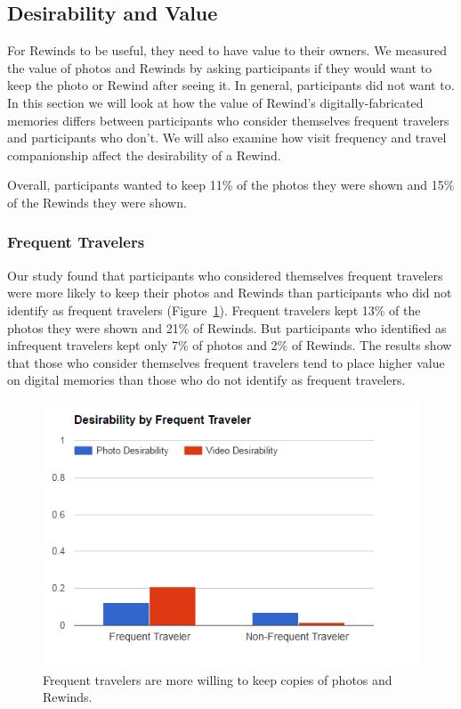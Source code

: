 \documentclass{sigchi}
\begin{document}
\subsection{Desirability and Value}
For Rewinds to be useful, they need to have value to their owners. We measured the value of photos and Rewinds by asking participants if they would want to keep the photo or Rewind after seeing it. In general, participants did not want to. In this section we will look at how the value of Rewind's digitally-fabricated memories differs between participants who consider themselves frequent travelers and participants who don't. We will also examine how visit frequency and travel companionship affect the desirability of a Rewind.

Overall, participants wanted to keep 11\% of the photos they were shown and 15\% of the Rewinds they were shown.

\subsubsection{Frequent Travelers}
Our study found that participants who considered themselves frequent travelers were more likely to keep their photos and Rewinds than participants who did not identify as frequent travelers (Figure~\ref{fig:frequencydesire}). Frequent travelers kept 13\% of the photos they were shown and 21\% of Rewinds. But participants who identified as infrequent travelers kept only 7\% of photos and 2\% of Rewinds. The results show that those who consider themselves frequent travelers tend to place higher value on digital memories than those who do not identify as frequent travelers.

\begin{figure}
   \centering
     \includegraphics[width=1\linewidth]{FreqTraveler_keep_2}
     \caption{Frequent travelers are more willing to keep copies of photos and Rewinds.}
     \label{fig:frequencydesire}
\end{figure}
\end{document}
